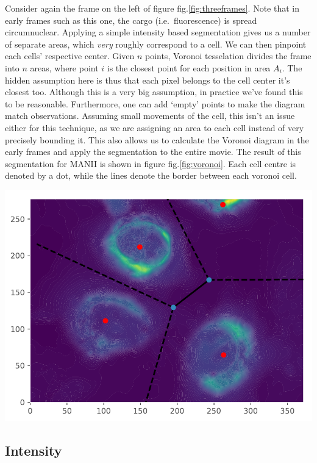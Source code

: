 \documentclass[12pt,a4paper,]{Dissertate}
\let\origfigure\figure
\let\endorigfigure\endfigure
\renewenvironment{figure}[1][2] {
    \expandafter\origfigure\expandafter[H]
} {
    \endorigfigure
}
\begin{document}
Consider again the frame on the left of figure
fig.\ref{fig:threeframes}. Note that in early frames such as this one,
the cargo (i.e.~fluorescence) is spread circumnuclear. Applying a simple
intensity based segmentation gives us a number of separate areas, which
\emph{very} roughly correspond to a cell. We can then pinpoint each
cells' respective center. Given \(n\) points, Voronoi tesselation
divides the frame into \(n\) areas, where point \(i\) is the closest
point for each position in area \(A_i\). The hidden assumption here is
thus that each pixel belongs to the cell center it's closest too.
Although this is a very big assumption, in practice we've found this to
be reasonable. Furthermore, one can add `empty' points to make the
diagram match observations. Assuming small movements of the cell, this
isn't an issue either for this technique, as we are assigning an area to
each cell instead of very precisely bounding it. This also allows us to
calculate the Voronoi diagram in the early frames and apply the
segmentation to the entire movie. The result of this segmentation for
MANII is shown in figure fig.\ref{fig:voronoi}. Each cell centre is
denoted by a dot, while the lines denote the border between each voronoi
cell.

\begin{figure}
\hypertarget{fig:voronoi}{%
\centering
\includegraphics{source/figures/pdf/Voronoi.pdf}
\caption{The obtained mask. Red dots are cell centers, dashed lines
infinite edges and solid lines finite edges.}\label{fig:voronoi}
}
\end{figure}

\hypertarget{intensity}{%
\subsection{Intensity}\label{intensity}}
\end{document}

